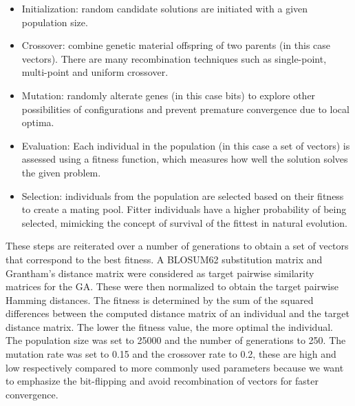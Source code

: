 \begin{itemize}
    \item Initialization: random candidate solutions are initiated with a given population size.
    \item Crossover: combine genetic material offspring of two parents (in this case vectors). There are many recombination techniques such as single-point, multi-point and uniform crossover.
    \item Mutation: randomly alterate genes (in this case bits) to explore other possibilities of configurations and prevent premature convergence due to local optima.
    \item Evaluation: Each individual in the population (in this case a set of vectors) is assessed using a fitness function, which measures how well the solution solves the given problem.
    \item Selection: individuals from the population are selected based on their fitness to create a mating pool. Fitter individuals have a higher probability of being selected, mimicking the concept of survival of the fittest in natural evolution.
\end{itemize}
These steps are reiterated over a number of generations to obtain a set of vectors that correspond to the best fitness. A BLOSUM62 substitution matrix \cite{blosum} and Grantham's distance matrix \cite{aa_evolution} were considered as target pairwise similarity matrices for the GA. These were then normalized to obtain the target pairwise Hamming distances. The fitness is determined by the sum of the squared differences between the computed distance matrix of an individual and the target distance matrix. The lower the fitness value, the more optimal the individual. The population size was set to 25000 and the number of generations to 250. The mutation rate was set to 0.15 and the crossover rate to 0.2, these are high and low respectively compared to more commonly used parameters because we want to emphasize the bit-flipping and avoid recombination of vectors for faster convergence.
